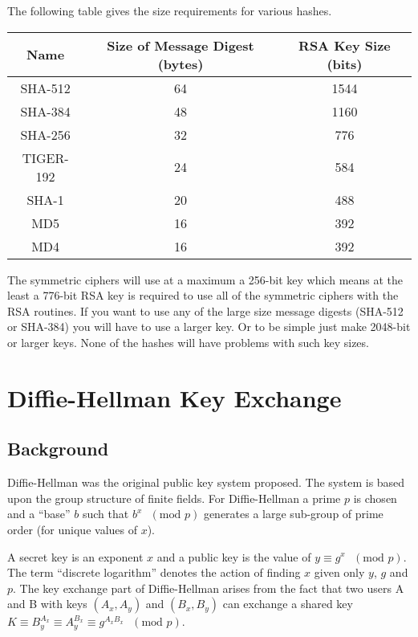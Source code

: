 \documentclass{book}
\begin{document}
The following table gives the size requirements for various hashes.
\begin{center}
\begin{tabular}{|c|c|c|}
      \hline Name & Size of Message Digest (bytes) & RSA Key Size (bits)\\
      \hline SHA-512 & 64 & 1544\\
      \hline SHA-384 & 48 & 1160 \\
      \hline SHA-256 & 32 & 776\\
      \hline TIGER-192 & 24 & 584\\
      \hline SHA-1 & 20 & 488\\
      \hline MD5 & 16 & 392\\
      \hline MD4 & 16 & 392\\
      \hline
\end{tabular}
\end{center}

The symmetric ciphers will use at a maximum a 256-bit key which means at the least a 776-bit RSA key is 
required to use all of the symmetric ciphers with the RSA routines. If you want to use any of the large size 
message digests (SHA-512 or SHA-384) you will have to use a larger key.  Or to be simple just make 2048-bit or larger
keys.  None of the hashes will have problems with such key sizes.

\chapter{Diffie-Hellman Key Exchange}

\section{Background}

Diffie-Hellman was the original public key system proposed.  The system is based upon the group structure
of finite fields.  For Diffie-Hellman a prime $p$ is chosen and a ``base'' $b$ such that $b^x\mbox{ }(\mbox{mod }p)$ 
generates a large sub-group of prime order (for unique values of $x$).

A secret key is an exponent $x$ and a public key is the value of $y \equiv g^x\mbox{ }(\mbox{mod }p)$.  The term
``discrete logarithm'' denotes the action of finding $x$ given only $y$, $g$ and $p$.  The key exchange part of
Diffie-Hellman arises from the fact that two users A and B with keys $(A_x, A_y)$ and $(B_x, B_y)$ can exchange 
a shared key $K \equiv B_y^{A_x} \equiv A_y^{B_x} \equiv g^{A_xB_x}\mbox{ }(\mbox{mod }p)$.
\end{document}
